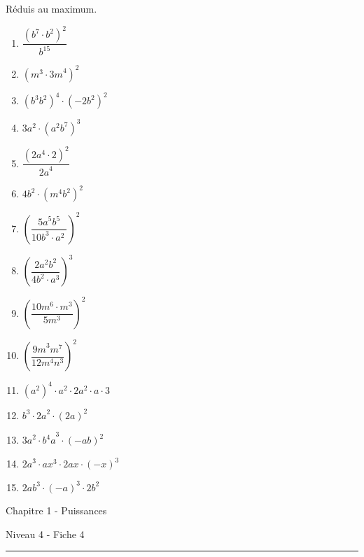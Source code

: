\documentclass[12pt,parskip=half-, twoside=semi]{scrartcl}
\begin{document}
\begin{exercise}
  Réduis au maximum.
  \begin{enumerate}[cols=3]

    \item \(\dfrac{\left( b^{7} \cdot b^{2} \right)^{2}}{b^{15}}\)
    \item \(\left( m^{3} \cdot {3m}^{4} \right)^{2}\)
    \item \(\left( b^{3}b^{2} \right)^{4} \cdot \left( - 2b^{2} \right)^{2}\)
    \item \({3a^{2} \cdot \left( a^{2}b^{7} \right)}^{3}\)
    \item \(\dfrac{\left( 2a^{4} \cdot 2 \right)^{2}}{{2a}^{4}}\)
    \item \({4b^{2} \cdot \left( m^{4}b^{2} \right)}^{2}\)
    \item \(\left( \dfrac{{5a}^{5}b^{5}}{10b^{3} \cdot a^{2}\ } \right)^{2}\)
    \item \(\left( \dfrac{2a^{2}b^{2}}{4b^{2} \cdot a^{3}} \right)^{3}\)
    \item \(\left( \dfrac{10m^{6} \cdot m^{3}}{5m^{3}} \right)^{2}\)
    \item \(\left( \dfrac{{9m}^{3}m^{7}}{12m^{4}n^{3}} \right)^{2}\)
    \item \(\left( a^{2} \right)^{4} \cdot a^{2} \cdot 2a^{2} \cdot a \cdot 3\)
    \item \(b^{3} \cdot {2a}^{2} \cdot (2a)^{2}\)
    \item \({3a}^{2} \cdot {b^{4}a}^{3} \cdot ( - ab)^{2}\)
    \item \({2a}^{3} \cdot {ax}^{3} \cdot 2ax \cdot ( - x)^{3}\)
    \item \({2ab}^{3} \cdot ( - a)^{3} \cdot {2b}^{2} \)
    
  \end{enumerate}
\end{exercise}

\newpage
\begin{center}
  \bfseries
  \begin{Huge}
    Chapitre 1 - Puissances
  \end{Huge}
  \smallbreak
  \begin{large}
    Niveau 4  - Fiche 4
  \end{large}
  \smallbreak
  \rule[10pt]{.5\linewidth}{1 pt}
\end{center}

\setcounter{exercise}{0}
\end{document}
